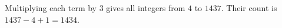 Multiplying each term by $3$ gives all integers from $4$ to $1437$. Their count is $1437-4+1=\boxed{1434}$.
